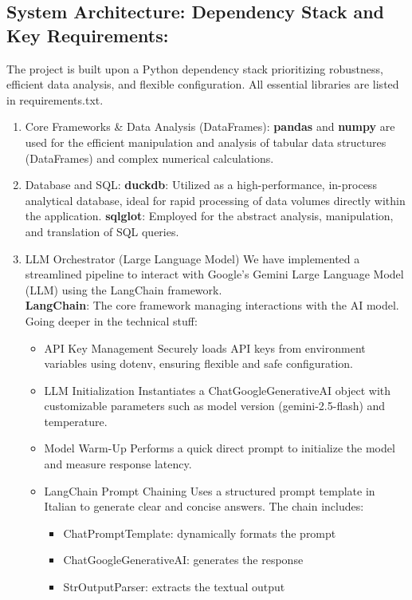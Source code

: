 \documentclass[12pt,a4paper]{article}
\begin{document}
\subsection{System Architecture: Dependency Stack and Key Requirements:}
The project is built upon a Python dependency stack prioritizing robustness, efficient data analysis, and flexible configuration. All essential libraries are listed in requirements.txt.
\begin{enumerate}
  \item Core Frameworks \& Data Analysis (DataFrames):
  \textbf{pandas} and \textbf{numpy} are used for the efficient manipulation and analysis of tabular data structures (DataFrames) and complex numerical calculations.
  \item Database and SQL:
  \textbf{duckdb}: Utilized as a high-performance, in-process analytical database, ideal for rapid processing of data volumes directly within the application.
  \textbf{sqlglot}: Employed for the abstract analysis, manipulation, and translation of SQL queries.
  \item LLM Orchestrator (Large Language Model)
  We have implemented a streamlined pipeline to interact with Google’s Gemini Large Language Model (LLM) using the LangChain framework.
  \\\textbf{LangChain}: The core framework managing interactions with the AI model.
  \\Going deeper in the technical stuff:
  \begin{itemize}
    \item  API Key Management Securely loads API keys from environment variables using dotenv, ensuring flexible and safe configuration.
    \item  LLM Initialization Instantiates a ChatGoogleGenerativeAI object with customizable parameters such as model version (gemini-2.5-flash) and temperature.
    \item  Model Warm-Up Performs a quick direct prompt to initialize the model and measure response latency.
    \item  LangChain Prompt Chaining Uses a structured prompt template in Italian to generate clear and concise answers. The chain includes:
        \begin{itemize}
          \item  ChatPromptTemplate: dynamically formats the prompt
          \item  ChatGoogleGenerativeAI: generates the response
          \item  StrOutputParser: extracts the textual output
        \end{itemize}
  \end{itemize}


\end{enumerate}
\end{document}
